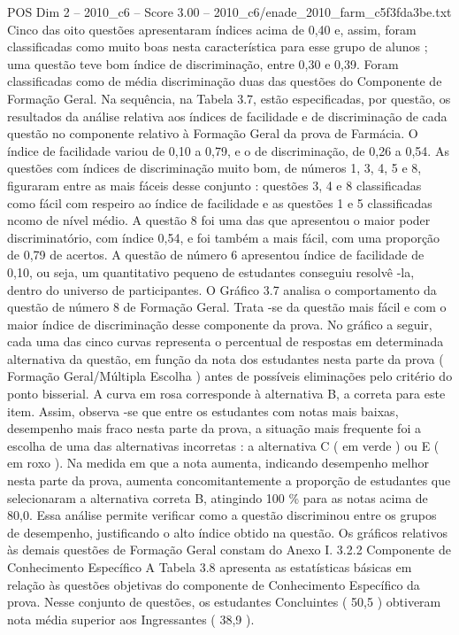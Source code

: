\begin{textsample}{POS Dim 2 – 2010\_c6 – Score 3.00 – 2010\_c6/enade\_2010\_farm\_c5f3fda3be.txt}
Cinco das oito questões apresentaram índices acima de 0,40 e, assim, foram classificadas como muito boas nesta característica para esse grupo de alunos ; uma questão teve bom índice de discriminação, entre 0,30 e 0,39.
Foram classificadas como de média discriminação duas das questões do Componente de Formação Geral.
Na sequência, na Tabela 3.7, estão especificadas, por questão, os resultados da análise relativa aos índices de facilidade e de discriminação de cada questão no componente relativo à Formação Geral da prova de Farmácia.
O índice de facilidade variou de 0,10 a 0,79, e o de discriminação, de 0,26 a 0,54.
As questões com índices de discriminação muito bom, de números 1, 3, 4, 5 e 8, figuraram entre as mais fáceis desse conjunto : questões 3, 4 e 8 classificadas como fácil com respeiro ao índice de facilidade e as questões 1 e 5 classificadas ncomo de nível médio.
A questão 8 foi uma das que apresentou o maior poder discriminatório, com índice 0,54, e foi também a mais fácil, com uma proporção de 0,79 de acertos.
A questão de número 6 apresentou índice de facilidade de 0,10, ou seja, um quantitativo pequeno de estudantes conseguiu resolvê -la, dentro do universo de participantes.
O Gráfico 3.7 analisa o comportamento da questão de número 8 de Formação Geral.
Trata -se da questão mais fácil e com o maior índice de discriminação desse componente da prova.
No gráfico a seguir, cada uma das cinco curvas representa o percentual de respostas em determinada alternativa da questão, em função da nota dos estudantes nesta parte da prova ( Formação Geral/Múltipla Escolha ) antes de possíveis eliminações pelo critério do ponto bisserial.
A curva em rosa corresponde à alternativa B, a correta para este item.
Assim, observa -se que entre os estudantes com notas mais baixas, desempenho mais fraco nesta parte da prova, a situação mais frequente foi a escolha de uma das alternativas incorretas : a alternativa C ( em verde ) ou E ( em roxo ).
Na medida em que a nota aumenta, indicando desempenho melhor nesta parte da prova, aumenta concomitantemente a proporção de estudantes que selecionaram a alternativa correta B, atingindo 100 \% para as notas acima de 80,0.
Essa análise permite verificar como a questão discriminou entre os grupos de desempenho, justificando o alto índice obtido na questão.
Os gráficos relativos às demais questões de Formação Geral constam do Anexo I. 3.2.2 Componente de Conhecimento Específico A Tabela 3.8 apresenta as estatísticas básicas em relação às questões objetivas do componente de Conhecimento Específico da prova.
Nesse conjunto de questões, os estudantes Concluintes ( 50,5 ) obtiveram nota média superior aos Ingressantes ( 38,9 ).

\end{textsample}
